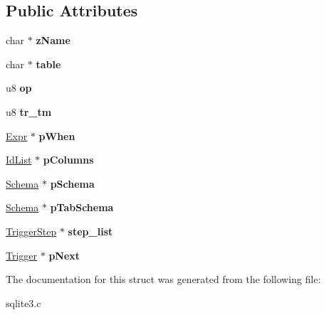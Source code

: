 \subsection*{Public Attributes}
\begin{DoxyCompactItemize}
\item 
char $\ast$ {\bfseries z\+Name}\hypertarget{structTrigger_a9aecea5dadd7ae93b7f585c4b914791c}{}\label{structTrigger_a9aecea5dadd7ae93b7f585c4b914791c}

\item 
char $\ast$ {\bfseries table}\hypertarget{structTrigger_ab9d5500f7fc43382e867733a2968ecae}{}\label{structTrigger_ab9d5500f7fc43382e867733a2968ecae}

\item 
u8 {\bfseries op}\hypertarget{structTrigger_a855d6b6a302d8d80e1d30ddd70fd403e}{}\label{structTrigger_a855d6b6a302d8d80e1d30ddd70fd403e}

\item 
u8 {\bfseries tr\+\_\+tm}\hypertarget{structTrigger_af0d10da140b068bfd76aaeb6607fa6cf}{}\label{structTrigger_af0d10da140b068bfd76aaeb6607fa6cf}

\item 
\hyperlink{structExpr}{Expr} $\ast$ {\bfseries p\+When}\hypertarget{structTrigger_a1b6cdd46e8b98562920d1acee86281ed}{}\label{structTrigger_a1b6cdd46e8b98562920d1acee86281ed}

\item 
\hyperlink{structIdList}{Id\+List} $\ast$ {\bfseries p\+Columns}\hypertarget{structTrigger_a8505fbdf63ca9eadf4b2585e99faa4e4}{}\label{structTrigger_a8505fbdf63ca9eadf4b2585e99faa4e4}

\item 
\hyperlink{structSchema}{Schema} $\ast$ {\bfseries p\+Schema}\hypertarget{structTrigger_a83edbfa91ce6520a6ebc1a21acc2cd5e}{}\label{structTrigger_a83edbfa91ce6520a6ebc1a21acc2cd5e}

\item 
\hyperlink{structSchema}{Schema} $\ast$ {\bfseries p\+Tab\+Schema}\hypertarget{structTrigger_a8e4a9b3f4bcc5c645e1777b3bb94a6d8}{}\label{structTrigger_a8e4a9b3f4bcc5c645e1777b3bb94a6d8}

\item 
\hyperlink{structTriggerStep}{Trigger\+Step} $\ast$ {\bfseries step\+\_\+list}\hypertarget{structTrigger_a4206faaae6cdf1a2b22a2c9f15c88642}{}\label{structTrigger_a4206faaae6cdf1a2b22a2c9f15c88642}

\item 
\hyperlink{structTrigger}{Trigger} $\ast$ {\bfseries p\+Next}\hypertarget{structTrigger_ac28107e1c45789e0146fe45867b8dfdb}{}\label{structTrigger_ac28107e1c45789e0146fe45867b8dfdb}

\end{DoxyCompactItemize}


The documentation for this struct was generated from the following file\+:\begin{DoxyCompactItemize}
\item 
sqlite3.\+c\end{DoxyCompactItemize}
